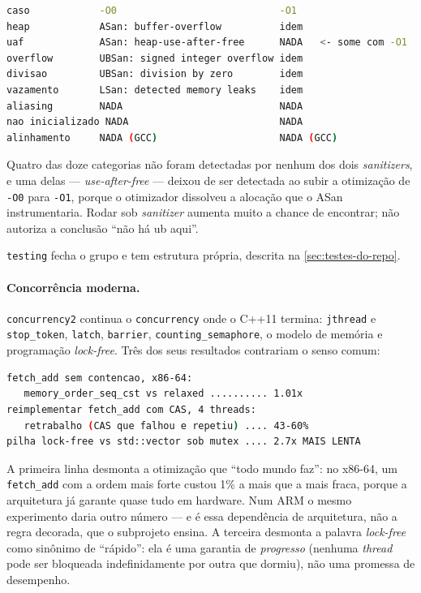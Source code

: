 \begin{lstlisting}[style=bt, language=bash,
    caption={Saída de \texttt{src/undefined\_behavior/}: o que ASan e UBSan
             pegaram, e o que passou.}]
caso            -O0                            -O1
heap            ASan: buffer-overflow          idem
uaf             ASan: heap-use-after-free      NADA   <- some com -O1
overflow        UBSan: signed integer overflow idem
divisao         UBSan: division by zero        idem
vazamento       LSan: detected memory leaks    idem
aliasing        NADA                           NADA
nao inicializado NADA                          NADA
alinhamento     NADA (GCC)                     NADA (GCC)
\end{lstlisting}

\begin{armadilha}
Quatro das doze categorias não foram detectadas por nenhum dos dois
\emph{sanitizers}, e uma delas --- \emph{use-after-free} --- deixou de ser
detectada ao subir a otimização de \texttt{-O0} para \texttt{-O1}, porque o
otimizador dissolveu a alocação que o ASan instrumentaria. Rodar sob
\emph{sanitizer} aumenta muito a chance de encontrar; não autoriza a conclusão
``não há \gls{ub} aqui''.
\end{armadilha}

\texttt{testing} fecha o grupo e tem estrutura própria, descrita na
\cref{sec:testes-do-repo}.

\paragraph{Concorrência moderna.}
\texttt{concurrency2} continua o \texttt{concurrency} onde o C++11 termina:
\texttt{jthread} e \texttt{stop\_token}, \texttt{latch}, \texttt{barrier},
\texttt{counting\_semaphore}, o modelo de memória e programação
\emph{lock-free}. Três dos seus resultados contrariam o senso comum:

\begin{lstlisting}[style=bt, language=bash,
    caption={Saída de \texttt{src/concurrency2/}: três medições contra o
             folclore de concorrência.}]
fetch_add sem contencao, x86-64:
   memory_order_seq_cst vs relaxed .......... 1.01x
reimplementar fetch_add com CAS, 4 threads:
   retrabalho (CAS que falhou e repetiu) .... 43-60%
pilha lock-free vs std::vector sob mutex .... 2.7x MAIS LENTA
\end{lstlisting}

A primeira linha desmonta a otimização que ``todo mundo faz'': no x86-64, um
\texttt{fetch\_add} com a ordem mais forte custou 1\% a mais que a mais fraca,
porque a arquitetura já garante quase tudo em hardware. Num ARM o mesmo
experimento daria outro número --- e é essa dependência de arquitetura, não a
regra decorada, que o subprojeto ensina. A terceira desmonta a palavra
\emph{lock-free} como sinônimo de ``rápido'': ela é uma garantia de
\emph{progresso} (nenhuma \emph{thread} pode ser bloqueada indefinidamente por
outra que dormiu), não uma promessa de desempenho.

